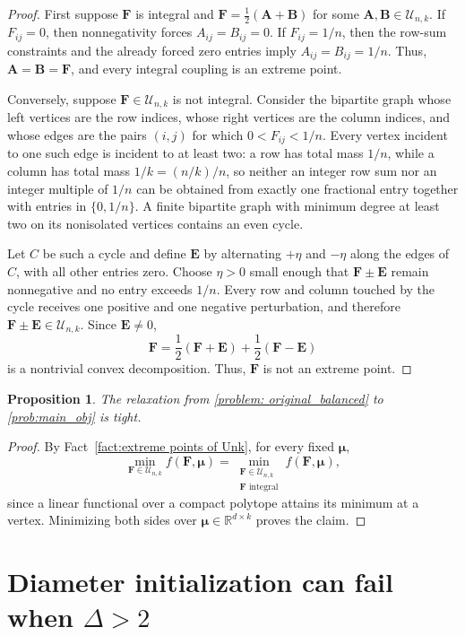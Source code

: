 \documentclass{article}
\theoremstyle{plain}
\newtheorem{proposition}[theorem]{Proposition}
\theoremstyle{definition}
\newcommand{\1}{\mathbf{1}}
\newcommand{\Rdk}{\mathbb{R}^{d\times k}}
\newcommand{\bUnk}{\mathcal{U}_{n,k}}
\newcommand{\bmF}{\bm{F}}
\newcommand{\bmu}{\bm{\mu}}
\begin{document}
\begin{proof}
First suppose $\bmF$ is integral and $\bmF=\frac{1}{2}(\bm{A}+\bm{B})$ for some 
$\bm{A},\bm{B}\in\bUnk$.
If $F_{ij}=0$, then nonnegativity forces $A_{ij}=B_{ij}=0$.
If $F_{ij}=1/n$, then the row-sum constraints and the already forced zero entries imply $A_{ij}=B_{ij}=1/n$.
Thus, $\bm{A}=\bm{B}=\bmF$, and every integral coupling is an extreme point.

Conversely, suppose $\bmF\in\bUnk$ is not integral.
Consider the bipartite graph whose left vertices are the row indices, whose right vertices are the column indices, and whose edges are the pairs $(i,j)$ for which $0<F_{ij}<1/n$.
Every vertex incident to one such edge is incident to at least two: a row has total mass $1/n$, while a column has total mass $1/k=(n/k)/n$, so neither an integer row sum nor an integer multiple of $1/n$ can be obtained from exactly one fractional entry together with entries in $\{0,1/n\}$.
A finite bipartite graph with minimum degree at least two on its nonisolated vertices contains an even cycle.

Let $C$ be such a cycle and define $\bm{E}$ by alternating $+\eta$ and $-\eta$ along the edges of $C$, with all other entries zero.
Choose $\eta>0$ small enough that $\bmF\pm\bm{E}$ remain nonnegative and no entry exceeds $1/n$.
Every row and column touched by the cycle receives one positive and one negative perturbation, and therefore $\bmF\pm\bm{E}\in\bUnk$.
Since $\bm{E}\neq0$,
\[
\bmF
=\frac{1}{2}(\bmF+\bm{E})+\frac{1}{2}(\bmF-\bm{E})
\]
is a nontrivial convex decomposition.
Thus, $\bmF$ is not an extreme point.
\end{proof}

\begin{proposition}
\label{prop:tightness of Kantorovich relaxation}
The relaxation from \eqref{problem: original_balanced} to \eqref{prob:main_obj} is tight.
\end{proposition}

\begin{proof}
By Fact~\ref{fact:extreme points of Unk}, for every fixed $\bmu$,
\[
\min_{\bmF\in\bUnk}f(\bmF,\bmu)
=
\min_{\substack{\bmF\in\bUnk\\\bmF\text{ integral}}}f(\bmF,\bmu),
\]
since a linear functional over a compact polytope attains its minimum at a vertex.
Minimizing both sides over $\bmu\in\Rdk$ proves the claim.
\end{proof}

\section{Diameter initialization can fail when $\Delta>2$}
\label{sec: diameter counterexample}
\end{document}
